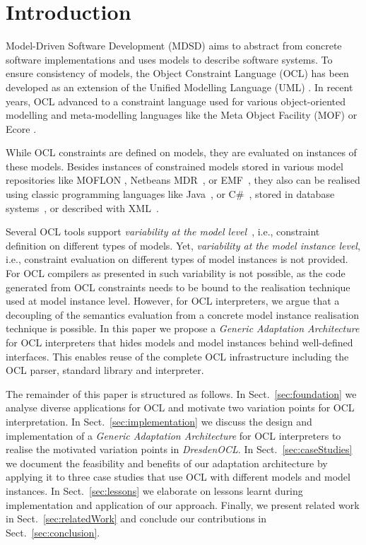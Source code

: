 \section{Introduction}
	Model-Driven Software Development (MDSD) aims to abstract from concrete 
	software implementations and uses models to describe software systems. 
	To ensure consistency of models, the Object Constraint Language 
	(OCL) \cite{spec:OCL2-2} has been developed as an extension of the Unified 
	Modelling Language (UML) \cite{spec:UML2-2,warmer:ocl}. In recent years,
	OCL advanced to a constraint language used for various object-oriented
	modelling and meta-modelling languages \cite{detaching} like the Meta
	Object Facility (MOF) \cite{UmlMof} or Ecore \cite{WWW:MDT}.

	While OCL constraints are defined on models,
	they are evaluated on instances of these models.
	 Besides instances of constrained models stored in various model repositories
	like MOFLON \cite{MOFLON}, Netbeans MDR~\cite{UmlMof}, or EMF~\cite{WWW:MDT},
	they also can be realised using classic programming languages like
	Java~\cite{demuthRGWS09}, or C\#~\cite{OCLCsharp}, stored in database systems~\cite{OCLRelDB}, or described with XML~\cite{OCLXML}. 
	
	Several OCL tools support \emph{variability at the model level}~\cite{braeuerOCL07,akehurst2003ocl}, i.e., constraint
	definition on different types of models. Yet, \emph{variability at the model
	instance level}, i.e., constraint evaluation on different types of model instances is not provided. 
	For OCL compilers as presented in
	\cite{UmlMof,demuthRGWS09,OCLCsharp,OCLRelDB} 
	such variability is not possible, as the code generated from OCL constraints 
	needs to be	bound to the realisation technique used at model instance
	level. 
	However, for OCL interpreters, we argue that a
	decoupling of the semantics evaluation from a concrete model instance realisation technique is possible.
	In this paper we propose a \emph{Generic Adaptation Architecture} for OCL
	interpreters that hides models and model instances behind well-defined
	interfaces. This enables reuse of the complete OCL infrastructure including the OCL parser, 
	standard library and interpreter.
	
	The remainder of this paper is structured as follows. In
	Sect.~\ref{sec:foundation} we analyse diverse applications for OCL and 
	motivate two variation points for OCL interpretation. In
	Sect.~\ref{sec:implementation} we discuss the design and implementation of a
	\emph{Generic Adaptation Architecture} for OCL interpreters to realise the
	motivated variation points in \emph{DresdenOCL}. In Sect.~\ref{sec:caseStudies}
	we document the feasibility and	benefits of our adaptation architecture by
	applying it to three case studies that use OCL with different models and model
	instances. In Sect.~\ref{sec:lessons} we elaborate on lessons learnt
	during implementation and application of our approach. Finally, we present
	related work in Sect.~\ref{sec:relatedWork} and conclude our contributions in
	Sect.~\ref{sec:conclusion}.
	
